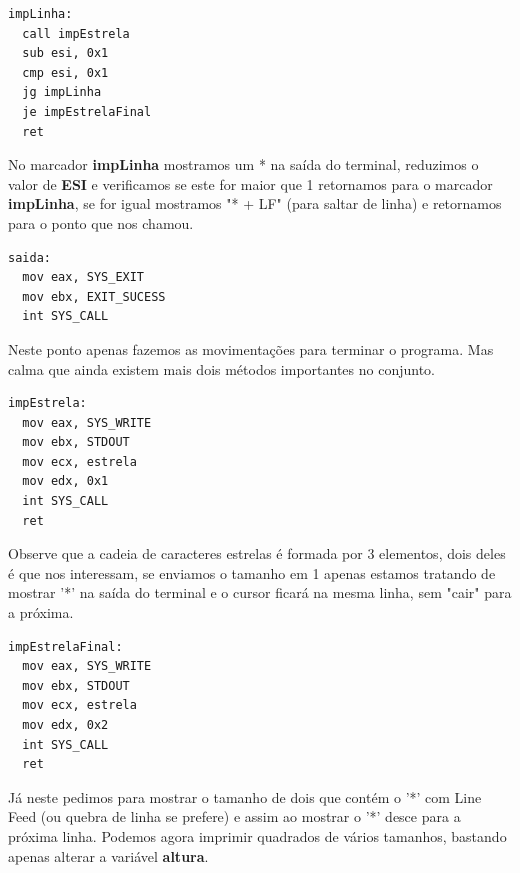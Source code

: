 \begin{lstlisting}[]
impLinha:
  call impEstrela
  sub esi, 0x1
  cmp esi, 0x1
  jg impLinha
  je impEstrelaFinal
  ret
\end{lstlisting}

No marcador \textbf{impLinha} mostramos um * na saída do terminal, reduzimos o valor de \textbf{ESI} e verificamos se este for maior que 1 retornamos para o marcador \textbf{impLinha}, se for igual mostramos "* + LF" (para saltar de linha) e retornamos para o ponto que nos chamou.

\begin{lstlisting}[]
saida:
  mov eax, SYS_EXIT
  mov ebx, EXIT_SUCESS
  int SYS_CALL	
\end{lstlisting}

Neste ponto apenas fazemos as movimentações para terminar o programa. Mas calma que ainda existem mais dois métodos importantes no conjunto.

\begin{lstlisting}[]
impEstrela:
  mov eax, SYS_WRITE
  mov ebx, STDOUT
  mov ecx, estrela
  mov edx, 0x1
  int SYS_CALL
  ret	
\end{lstlisting}

Observe que a cadeia de caracteres estrelas é formada por 3 elementos, dois deles é que nos interessam, se enviamos o tamanho em 1 apenas estamos tratando de mostrar '*' na saída do terminal e o cursor ficará na mesma linha, sem "cair" para a próxima.

\begin{lstlisting}[]
impEstrelaFinal:
  mov eax, SYS_WRITE
  mov ebx, STDOUT
  mov ecx, estrela
  mov edx, 0x2
  int SYS_CALL
  ret	
\end{lstlisting}

Já neste pedimos para mostrar o tamanho de dois que contém o '*' com Line Feed (ou quebra de linha se prefere) e assim ao mostrar o '*' desce para a próxima linha. Podemos agora imprimir quadrados de vários tamanhos, bastando apenas alterar a variável \textbf{altura}.

\clearpage
